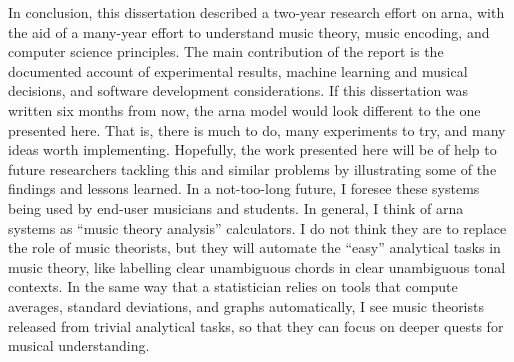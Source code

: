 
In conclusion, this dissertation described a two-year
research effort on \gls{arna}, with the aid of a many-year
effort to understand music theory, music encoding, and
computer science principles. The main contribution of the
report is the documented account of experimental results,
machine learning and musical decisions, and software
development considerations. If this dissertation was written
six months from now, the \gls{arna} model would look
different to the one presented here. That is, there is much
to do, many experiments to try, and many ideas worth
implementing. Hopefully, the work presented here will be of
help to future researchers tackling this and similar
problems by illustrating some of the findings and lessons
learned. In a not-too-long future, I foresee these systems
being used by end-user musicians and students. In general, I
think of \gls{arna} systems as ``music theory analysis''
calculators. I do not think they are to replace the role of
music theorists, but they will automate the ``easy''
analytical tasks in music theory, like labelling clear
unambiguous chords in clear unambiguous tonal contexts. In
the same way that a statistician relies on tools that
compute averages, standard deviations, and graphs
automatically, I see music theorists released from trivial
analytical tasks, so that they can focus on deeper quests
for musical understanding. 
